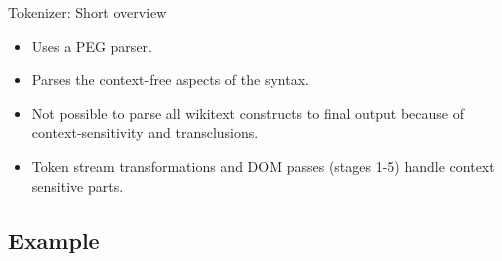 \documentclass[t,xcolor=dvipsnames]{beamer}
\begin{document}
\begin{frame}{Tokenizer: Short overview}
\begin{itemize}
\item Uses a PEG parser.
\item Parses the context-free aspects of the syntax.
\item Not possible to parse all wikitext constructs to final output because of context-sensitivity and transclusions.
\item Token stream transformations and DOM passes (stages 1-5) handle context sensitive parts.
\end{itemize}
\end{frame}

\subsection{Example}
\end{document}
